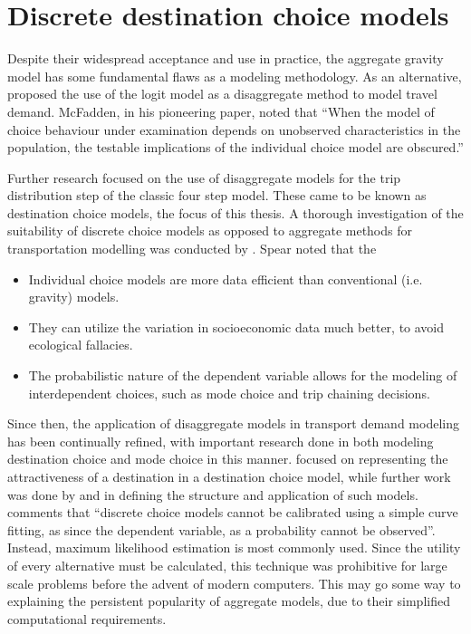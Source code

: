\section{Discrete destination choice models}
Despite their widespread acceptance and use in practice, the aggregate gravity model has some fundamental flaws as a modeling methodology. As an alternative, \textcite{McFadden73, Akiva74} proposed the use of the logit model as a disaggregate method to model travel demand. McFadden, in his pioneering paper, noted that \enquote{When the model of choice behaviour under examination depends on unobserved characteristics in the population, the testable implications of the individual choice model are obscured.}\parencite{McFadden73}

Further research focused on the use of disaggregate models for the trip distribution step of the classic four step model. These came to be known as destination choice models, the focus of this thesis. A thorough investigation of the suitability of discrete choice models as opposed to aggregate methods for transportation modelling was conducted by \textcite{Spear77}. Spear noted that the 
\begin{itemize}
\item Individual choice models are more data efficient than conventional (i.e. gravity) models.
\item They can utilize the variation in socioeconomic data much better, to avoid ecological fallacies.
\item The probabilistic nature of the dependent variable allows for the modeling of interdependent choices, such as mode choice and trip chaining decisions. 
\end{itemize}
	
Since then, the application of disaggregate models in transport demand modeling has been continually refined, with important research done in both modeling destination choice and mode choice in this manner. \textcite{Daly82} focused on representing the attractiveness of a destination in a destination choice model, while further work was done by \textcite{Akiva74} and \textcite{Anas81} in defining the structure and application of such models. \textcite{Train09} comments that \enquote{discrete choice models cannot be calibrated using a simple curve fitting, as since the dependent variable, as a probability cannot be observed}. Instead, maximum likelihood estimation is most commonly used. Since the utility of every alternative must be calculated, this technique was prohibitive for large scale problems before the advent of modern computers. This may go some way to explaining the persistent popularity of aggregate models, due to their simplified computational requirements.

